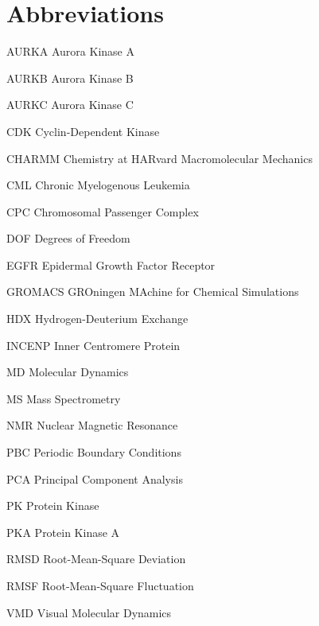 \chapter*{Abbreviations}
\thispagestyle{plain}

\begin{abbreviations}
    \item[AURKA] Aurora Kinase A
    \item[AURKB] Aurora Kinase B
    \item[AURKC] Aurora Kinase C
    \item[CDK] Cyclin-Dependent Kinase
    \item[CHARMM] Chemistry at HARvard Macromolecular Mechanics
    \item[CML] Chronic Myelogenous Leukemia 
    \item[CPC] Chromosomal Passenger Complex
    \item[DOF] Degrees of Freedom
    \item[EGFR] Epidermal Growth Factor Receptor
    \item[GROMACS] GROningen MAchine for Chemical Simulations
    \item[HDX] Hydrogen-Deuterium Exchange
    \item[INCENP] Inner Centromere Protein
    \item[MD] Molecular Dynamics
    \item[MS] Mass Spectrometry
    \item[NMR] Nuclear Magnetic Resonance
    \item[PBC] Periodic Boundary Conditions
    \item[PCA] Principal Component Analysis
    \item[PK] Protein Kinase
    \item[PKA] Protein Kinase A
    \item[RMSD] Root-Mean-Square Deviation
    \item[RMSF] Root-Mean-Square Fluctuation
    \item[VMD] Visual Molecular Dynamics
\end{abbreviations}